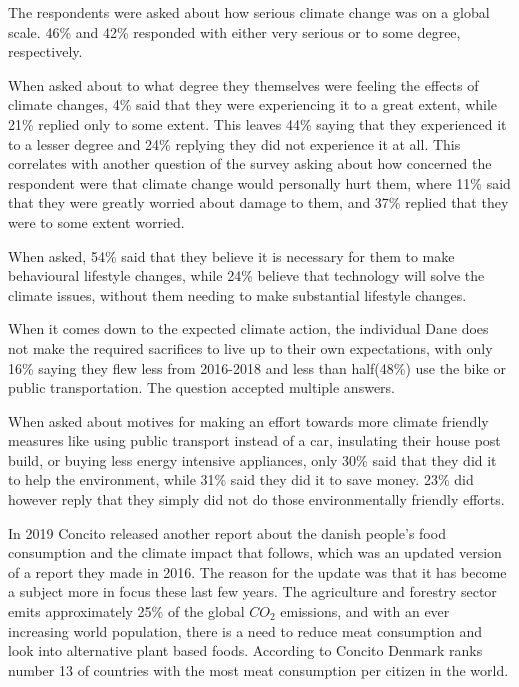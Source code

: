         The respondents were asked about how serious climate change was on a global scale. 46\% and 42\% responded with either very serious or to some degree, respectively. 
        
        When asked about to what degree they themselves were feeling the effects of climate changes, 4\% said that they were experiencing it to a great extent, while 21\% replied only to some extent. This leaves 44\% saying that they experienced it to a lesser degree and 24\% replying they did not experience it at all\cite{concito}. This correlates with another question of the survey asking about how concerned the respondent were that climate change would personally hurt them, where 11\% said that they were greatly worried about damage to them, and 37\% replied that they were to some extent worried\cite{concito}.
        
        When asked, 54\% said that they believe it is necessary for them to make behavioural lifestyle changes, while 24\% believe that technology will solve the climate issues, without them needing to make substantial lifestyle changes\cite{concito}.

        When it comes down to the expected climate action, the individual Dane does not make the required sacrifices to live up to their own expectations, with only 16\% saying they flew less from 2016-2018 and less than half(48\%) use the bike or public transportation. The question accepted multiple answers\cite{concito}.
        
        When asked about motives for making an effort towards more climate friendly measures like using public transport instead of a car, insulating their house post build, or buying less energy intensive appliances, only 30\% said that they did it to help the environment, while 31\% said they did it to save money. 23\% did however reply that they simply did not do those environmentally friendly efforts\cite{concito}.
        
        In 2019 Concito released another report about the danish people's food consumption and the climate impact that follows, which was an updated version of a report they made in 2016. The reason for the update was that it has become a subject more in focus these last few years\cite{concitoFood}. The agriculture and forestry sector emits approximately 25\% of the global $CO_2$ emissions, and with an ever increasing world population, there is a need to reduce meat consumption and look into alternative plant based foods\cite{concitoFood}. According to Concito Denmark ranks number 13 of countries with the most meat consumption per citizen in the world\cite{concitoFood}.
        
